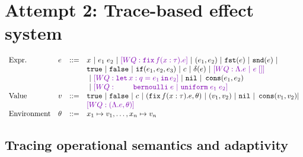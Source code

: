 \documentclass[a4paper,11pt]{article}
\theoremstyle{definition}
\begin{document}
%
%


\section{Attempt 2: Trace-based effect system}
\[\begin{array}{llll}
\mbox{Expr.} & \expr & ::= & x ~|~ \expr_1 \eapp \expr_2 ~|~ \wq{\efix f(x:\type).\expr}
 ~|~ (\expr_1, \expr_2) ~|~ \eprojl(\expr) ~|~ \eprojr(\expr) ~| \\
%
& & & \etrue ~|~ \efalse ~|~ \eif(\expr_1, \expr_2, \expr_3) ~|~
\econst ~|~ \eop(\expr)  ~|~ \wq {\eilam \expr ~|~ \expr \eapp [] } \\
& & & ~|~ \wq {\elet  x:q = \expr_1 \ein \expr_2 } ~|~ \enil ~|~  \econs (
      \expr_1, \expr_2) \\
& & & ~|~ \wq{ ~~~~~~~
 \bernoulli \eapp \expr ~|~ \uniform \eapp \expr_1 \eapp
      \expr_2 } \\
%
\mbox{Value} & \valr & ::= & \etrue ~|~ \efalse ~|~ \econst ~|~
(\efix f(x:\type).\expr, \env) ~|~ (\valr_1, \valr_2) 
    ~|~ \enil ~|~ \econs (\valr_1, \valr_2) | \\
& & & \wq {(\eilam \expr , \env) } \\ 
%
\mbox{Environment} & \env & ::= & x_1 \mapsto \valr_1, \ldots, x_n \mapsto \valr_n
\end{array}\]





\subsection{Tracing operational semantics and adaptivity}
\end{document}
